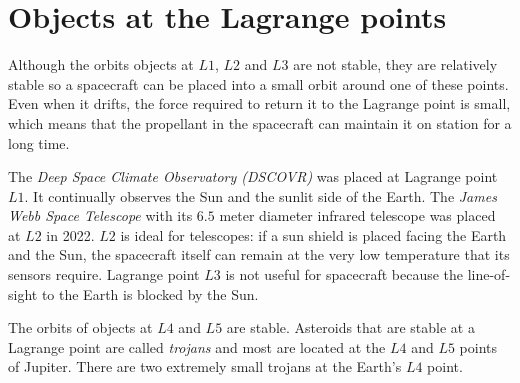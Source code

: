 \section{Objects at the Lagrange points}

Although the orbits objects at $L1$, $L2$ and $L3$ are not stable, they are relatively stable so a spacecraft can be placed into a small orbit around one of these points. Even when it drifts, the force required to return it to the Lagrange point is small, which means that the propellant in the spacecraft can maintain it on station for a long time.

The \emph{Deep Space Climate Observatory (DSCOVR)} was placed at Lagrange point $L1$. It continually observes the Sun and the sunlit side of the Earth. The \emph{James Webb Space Telescope} with its $6.5$ meter diameter infrared telescope was placed at $L2$ in 2022.  $L2$ is ideal for telescopes: if a sun shield is placed facing the Earth and the Sun, the spacecraft itself can remain at the very low temperature that its sensors require. Lagrange point $L3$ is not useful for spacecraft because the line-of-sight to the Earth is blocked by the Sun.

The orbits of objects at $L4$ and $L5$ are stable. Asteroids that are stable at a Lagrange point are called \emph{trojans} and most are located at the $L4$ and $L5$ points of Jupiter. There are two extremely small trojans at the Earth's $L4$ point.
